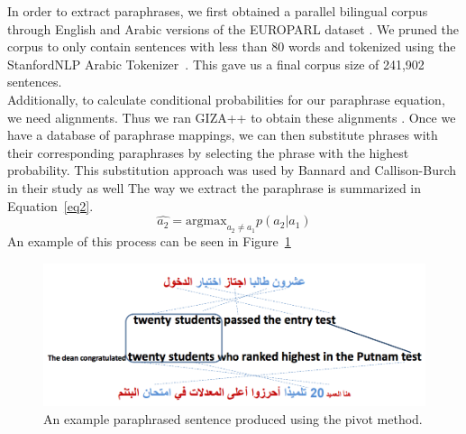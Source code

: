 \documentclass[11pt,letterpaper]{article}
\begin{document}
In order to extract paraphrases, we first obtained a parallel bilingual corpus through English and Arabic versions of the EUROPARL dataset \cite{Koehn_europarl}. We pruned the corpus to only contain sentences with less than 80 words and tokenized using the StanfordNLP Arabic Tokenizer~\cite{manning}. This gave us a final corpus size of 241,902 sentences.\\ 
Additionally, to calculate conditional probabilities for our paraphrase equation, we need alignments. Thus we ran GIZA++ to obtain these alignments \cite{och03:asc}. Once we have a database of paraphrase mappings, we can then substitute phrases with their corresponding paraphrases by selecting the phrase with the highest probability. This substitution approach was used by Bannard and Callison-Burch in their study as well \cite{bannard2005bilingual} The way we extract the paraphrase is summarized in Equation~\ref{eq2}. 
\begin{equation}
\hat{a_2} = \text{argmax}_{a_2 \neq a_1} p(a_2 | a_1)
\label{eq2}
\end{equation}
An example of this process can be seen in Figure~\ref{fig:pivot}
\begin{figure}
\includegraphics[scale=0.25]{arabic_pivot}
\caption{An example paraphrased sentence produced using the pivot method. }
\label{fig:pivot}
\end{figure}
\end{document}
